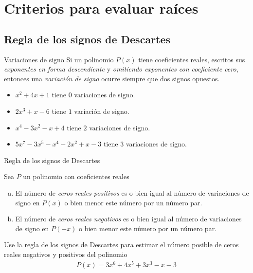 \section{Criterios para evaluar raíces}

\subsection{Regla de los signos de Descartes}

{Variaciones de signo}
Si un polinomio $P(x)$ tiene coeficientes reales, escritos sus \emph{exponentes en forma descendiente} y \emph{omitiendo exponentes con coeficiente cero}, entonces una \emph{variación de signo} ocurre siempre que dos signos opuestos. 


{}
\begin{problema}
\begin{itemize}
\item $x^{2}+4x+1$ tiene $0$ variaciones de signo.
\item $2x^{3}+x-6$ tiene $1$ variación de signo.
\item $x^{4}-3x^{2}-x+4$ tiene $2$ variaciones de signo.
\item $5x^{7}-3x^{5}-x^{4}+2x^{2}+x-3$ tiene  $3$ variaciones de signo.
\end{itemize}

\end{problema}


{Regla de los signos de Descartes}
\begin{prop}
Sea $P$ un polinomio con coeficientes reales
\begin{enumerate}[(a)]
\item El número de \emph{ceros reales positivos} es o bien igual al número de variaciones de signo en $P(x)$ o bien menor este número por un número par. 
\item El número de \emph{ceros reales negativos} es o bien igual al número de variaciones de signo en $P(-x)$ o bien menor este número por un número par. 
\end{enumerate}

\end{prop}


{}
\begin{problema}
Use la regla de los signos de Descartes para estimar el número posible de ceros reales negativos y positivos del polinomio
\begin{align*}
P(x)= 3x^{6}+4x^{5}+3x^{3}-x-3
\end{align*}

\end{problema}

